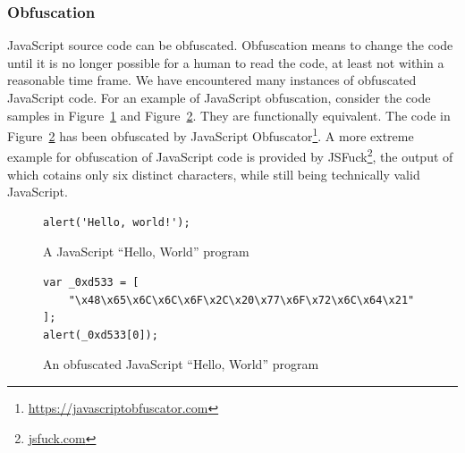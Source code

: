\documentclass[
    fontsize=12pt,
    headings=small,
    parskip=half,
    bibliography=totoc,
    numbers=noenddot,
    open=any
    ]{scrreprt}
\begin{document}
\subsubsection{Obfuscation}
\label{fundamentals:obfuscation}
JavaScript source code can be obfuscated. Obfuscation means to change the code
until it is no longer possible for a human to read the code, at least not within
a reasonable time frame. We have encountered many instances of obfuscated JavaScript
code. For an example of JavaScript obfuscation, consider the code samples in
Figure~\ref{code:javascript_hello_world} and Figure~\ref{code:javascript_obfuscated}.
They are functionally equivalent. The code in Figure~\ref{code:javascript_obfuscated}
has been obfuscated by JavaScript Obfuscator\footnote{\url{https://javascriptobfuscator.com}}.
A more extreme example for obfuscation of JavaScript code is provided by JSFuck\footnote{\url{jsfuck.com}},
the output of which cotains only six distinct characters, while still being technically valid JavaScript.

\begin{figure}
\centering
\begin{verbatim}
alert('Hello, world!');
\end{verbatim}
\caption{A JavaScript ``Hello, World'' program}
\label{code:javascript_hello_world}
\end{figure}

\begin{figure}
\centering
\begin{verbatim}
var _0xd533 = [
    "\x48\x65\x6C\x6C\x6F\x2C\x20\x77\x6F\x72\x6C\x64\x21"
];
alert(_0xd533[0]);
\end{verbatim}
\caption{An obfuscated JavaScript ``Hello, World'' program}
\label{code:javascript_obfuscated}
\end{figure}
\end{document}
